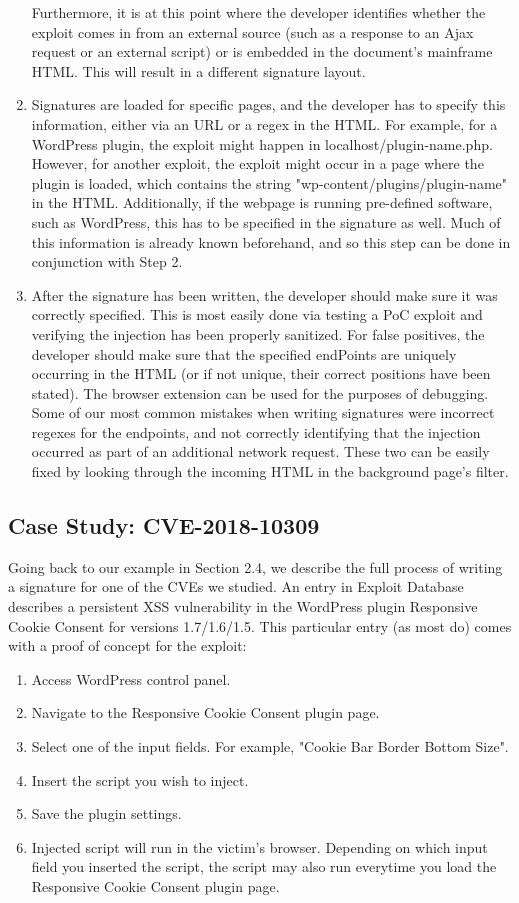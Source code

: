 \begin{enumerate}
Furthermore, it is at this point where the developer identifies whether the exploit comes in from an external source (such as a response to an Ajax request or an external script) or is embedded in the document's mainframe HTML. This will result in a different signature layout. 
\item
Signatures are loaded for specific pages, and the developer has to specify this information, either via an URL or a regex in the HTML. For example, for a WordPress plugin, the exploit might happen in localhost/plugin-name.php. However, for another exploit, the exploit might occur in a page where the plugin is loaded, which contains the string "wp-content/plugins/plugin-name" in the HTML. Additionally, if the webpage is running pre-defined software, such as WordPress, this has to be specified in the signature as well. Much of this information is already known beforehand, and so this step can be done in conjunction with Step 2.
\item
After the signature has been written, the developer should make sure it was correctly specified. This is most easily done via testing a PoC exploit and verifying the injection has been properly sanitized. For false positives, the developer should make sure that the specified endPoints are uniquely occurring in the HTML (or if not unique, their correct positions have been stated). The browser extension can be used for the purposes of debugging. Some of our most common mistakes when writing signatures were incorrect regexes for the endpoints, and not correctly identifying that the injection occurred as part of an additional network request. These two can be easily fixed by looking through the incoming HTML in the background page's filter. 
\end{enumerate}

\subsection{Case Study: CVE-2018-10309}
Going back to our example in Section 2.4, we describe the full process of writing a signature for one of the CVEs we studied. An entry in Exploit Database \cite{studyCVE} describes a persistent XSS vulnerability in the WordPress plugin Responsive Cookie Consent for versions 1.7/1.6/1.5. This particular entry (as most do) comes with a proof of concept for the exploit: 
\begin{enumerate}
\item Access WordPress control panel.
\item Navigate to the Responsive Cookie Consent plugin page.
\item Select one of the input fields. For example, "Cookie Bar Border Bottom Size".
\item Insert the script you wish to inject.
\item Save the plugin settings.
\item Injected script will run in the victim's browser. Depending on which input field you inserted the script, the script may also run everytime you load the Responsive Cookie Consent plugin page.
	
\end{enumerate}

